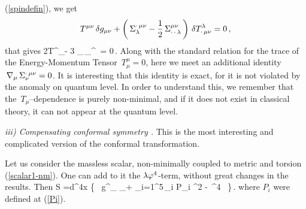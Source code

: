 (\ref{spindefin}), we get
$$
T^{\mu\nu}\,\delta g_{\mu\nu} + \left(\,\Sigma_\lambda^{\cdot\,\mu\nu} 
- \frac12\,\Sigma_{\cdot\,\cdot\,\lambda}^{\mu\nu}\,\right)\,\delta 
T^\lambda_{\cdot\,\mu\nu} = 0\,,
$$
that gives  
\beq
2T^\mu_\mu - 3\,\om\,\na_\mu\,\Si_\nu^{\cdot\,\mu\nu} = 0\,.
\label{Noether22}
\eeq
Along with the standard relation for the
trace of the Energy-Momentum Tensor $\,T^\mu_\mu = 0$, 
here we meet an additional 
identity $\,\nabla_\mu\,\Sigma_\nu^{\cdot\,\mu\nu} = 0$. It is
interesting that this identity is exact, for it is not violated 
by the anomaly on quantum level. In order to understand this, 
we remember that the $\,T_\mu$--dependence is purely
non-minimal, and if it does not exist in classical theory, 
it can not appear at the quantum level. 
\vskip 2mm

{\it iii) Compensating conformal symmetry \cite{obukhov,anhesh}.}
This is the most interesting and complicated version of 
the conformal transformation. 

Let us consider the massless scalar,
non-minimally coupled to metric and torsion (\ref{scalar1-nm}).
One can add to it the $\lambda\varphi^4$-term, without great changes in 
the results. Then  
 \bea
 S =\int d^4x \; \left\{
 \,  \;g^{\mu\nu}\partial_{\mu}\ph\;
\partial_{\nu}\ph +  \;\sum_{i=1}^{5}\,\xi_i P_i \ph^2
 - \,\ph^4 \, \right\}\,.
 \label{n7}
 \eea
where $P_i$ were defined at (\ref{Pi}). 

